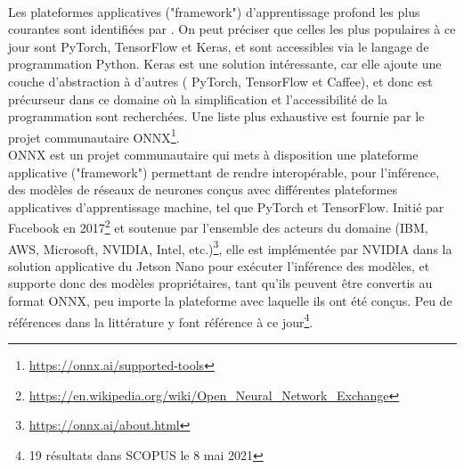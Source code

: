 \vspace{\baselineskip}
\\
\noindent Les plateformes applicatives ("framework") d'apprentissage profond les plus courantes sont identifiées par \parencite{cornioley_integration_nodate}. On peut préciser que celles les plus populaires à ce jour sont PyTorch, TensorFlow et Keras, et sont accessibles via le langage de programmation Python. Keras est une solution intéressante, car elle ajoute une couche d'abstraction à d'autres ( PyTorch, TensorFlow et Caffee), et donc est précurseur dans ce domaine où la simplification et l'accessibilité de la programmation sont recherchées. Une liste plus exhaustive est fournie par le projet communautaire ONNX\footnote{\url{https://onnx.ai/supported-tools}}.
\vspace{\baselineskip}
\\
\noindent ONNX est un projet communautaire qui mets à disposition une plateforme applicative ("framework") permettant de rendre interopérable, pour l'inférence, des modèles de réseaux de neurones conçus avec différentes plateformes applicatives d'apprentissage machine, tel que PyTorch et TensorFlow. Initié par Facebook en 2017\footnote{\url{https://en.wikipedia.org/wiki/Open_Neural_Network_Exchange}} et soutenue par l'ensemble des acteurs du domaine (IBM, AWS, Microsoft, NVIDIA, Intel, etc.)\footnote{\url{https://onnx.ai/about.html}}, elle est implémentée par NVIDIA dans la solution applicative du Jetson Nano pour exécuter l'inférence des modèles, et supporte donc des modèles propriétaires, tant qu'ils peuvent être convertis au format ONNX, peu importe la plateforme avec laquelle ils ont été conçus. Peu de références dans la littérature y font référence à ce jour\footnote{19 résultats dans SCOPUS le 8 mai 2021}.